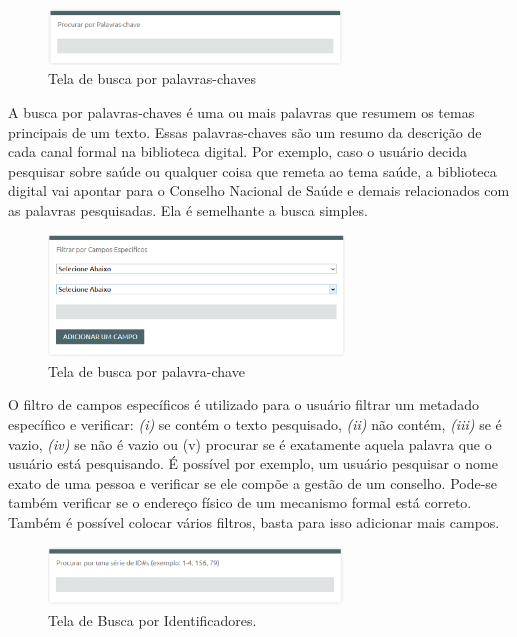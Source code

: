 \graphicspath{{figuras/prototipo/}}
\begin{figure}[H]
\centering
\includegraphics[width=0.7\textwidth]{busca-palavra-chave}
\caption{Tela de busca por palavras-chaves}
\label{fig:buscachaves_prototipo}
\end{figure}

A busca por palavras-chaves é uma ou mais palavras que resumem os temas principais de um texto. Essas palavras-chaves são um resumo da descrição de cada canal formal na biblioteca digital. Por exemplo, caso o usuário decida pesquisar sobre saúde ou qualquer coisa que remeta ao tema saúde, a biblioteca digital vai apontar para o Conselho Nacional de Saúde e demais relacionados com as palavras pesquisadas. Ela é semelhante a busca simples.

\graphicspath{{figuras/prototipo/}}
\begin{figure}[H]
\centering
\includegraphics[width=0.7\textwidth]{busca-assunto-especifico}
\caption{Tela de busca por palavra-chave}
\label{fig:buscaespecifico_prototipo}
\end{figure}

O filtro de campos específicos é utilizado para o usuário filtrar um metadado específico e verificar: \textit{(i)} se contém o texto pesquisado, \textit{(ii)} não contém, \textit{(iii)} se é vazio, \textit{(iv)} se não é vazio ou (v) procurar se é exatamente aquela palavra que o usuário está pesquisando. É possível por exemplo, um usuário pesquisar o nome exato de uma pessoa e verificar se ele compõe a gestão de um conselho. Pode-se também verificar se o endereço físico de um mecanismo formal está correto. Também é possível colocar vários filtros, basta para isso adicionar mais campos.

\graphicspath{{figuras/prototipo/}}
\begin{figure}[H]
\centering
\includegraphics[width=0.7\textwidth]{busca-identificadores}
\caption{Tela de Busca por Identificadores.}
\label{fig:buscaidentificadores_prototipo}
\end{figure}

